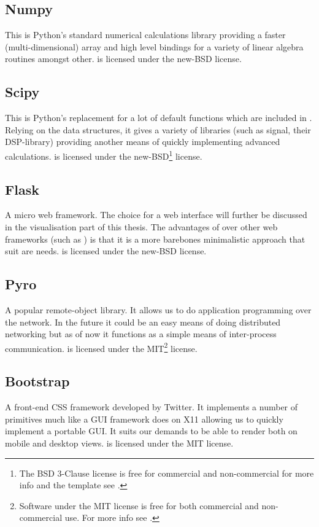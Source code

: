 \documentclass[a4paper, openany, oneside]{memoir}
\begin{document}
\subsection{Numpy}
\label{sec:numpy}
This is Python's standard numerical calculations library providing a faster (multi-dimensional) array and high level bindings for a variety of linear algebra routines amongst other.  is licensed under the new-BSD license.

\subsection{Scipy}
\label{sec:scipy}
This is Python's replacement for a lot of default functions which are included in \matlab{}. Relying on the  data structures, it gives a variety of libraries (such as signal, their DSP-library) providing another means of quickly implementing advanced calculations.  is licensed under the new-BSD\footnote{\label{fn:bsd}The BSD 3-Clause license is free for commercial and non-commercial for more info and the template see \cite{bsdlic}.} license.

\subsection{Flask}
\label{sec:flask}
A micro web framework. The choice for a web interface will further be discussed in the visualisation part of this thesis. The advantages of  over other web frameworks (such as ) is that it is a more barebones minimalistic approach that suit are needs.  is licensed under the new-BSD license.

\subsection{Pyro}
\label{sec:pyro}
A popular remote-object library. It allows us to do application programming over the network. In the future it could be an easy means of doing distributed networking but as of now it functions as a simple means of inter-process communication.  is licensed under the MIT\footnote{\label{fn:mit}Software under the MIT license is free for both commercial and non-commercial use. For more info see \cite{mitlic}.} license.

\subsection{Bootstrap}
\label{sec:bootstrap}
A front-end CSS framework developed by Twitter. It implements a number of primitives much like a GUI framework does on X11 allowing us to quickly implement a portable GUI. It suits our demands to be able to render both on mobile and desktop views.  is licensed under the MIT license.
\end{document}
